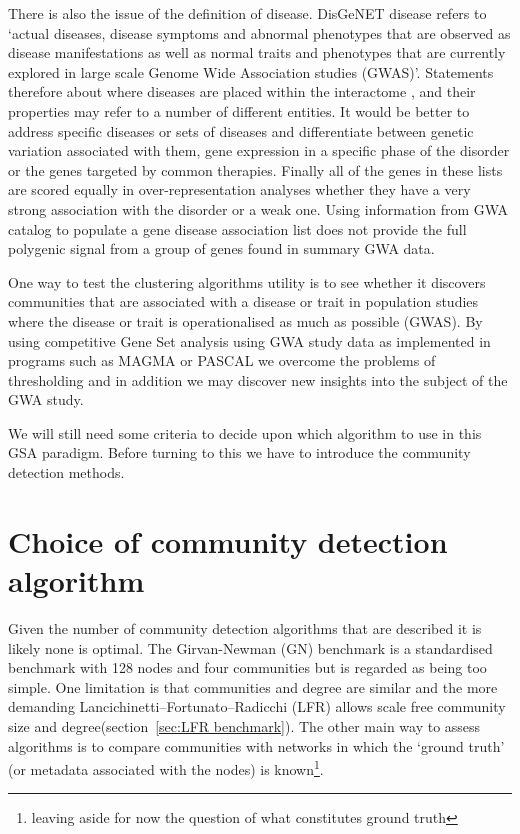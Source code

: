 There is also the issue of the definition of disease.  DisGeNET disease refers to `actual diseases, disease symptoms and abnormal phenotypes that are observed as disease manifestations as well as normal traits and phenotypes that are currently explored in large scale Genome Wide Association studies (GWAS)\cite{pinero2020disgenet}'. Statements therefore about where diseases are placed within the interactome \cite{barabasi2016network},\cite{ghiassian2015disease} and their properties may refer to a number of different entities. It would be better to address specific diseases or sets of diseases and differentiate between genetic variation associated with them, gene expression in a specific phase of the disorder or the genes targeted by common therapies. Finally all of the genes in these lists are scored equally in over-representation analyses whether they have a very strong association with the disorder or a weak one. Using information from GWA catalog to populate a gene disease association list does not provide the full polygenic signal from a group of genes found in summary GWA data. 

One way to test the clustering algorithms utility is to see whether it discovers communities that are associated with a disease or trait in population studies where the disease or trait is operationalised as much as possible (GWAS)\cite{cai2020reviewing}\cite{van2013power}. By using competitive Gene Set analysis using GWA study data as implemented in programs such as MAGMA\cite{de2015magma} or PASCAL\cite{lamparter2016fast} we overcome the problems of thresholding and in addition we may discover new insights into the subject of the GWA study.

We will still need some criteria to decide upon which algorithm to use in this GSA paradigm. Before turning to this we have to introduce the community detection methods. 





\section{Choice of community detection algorithm}
\label{sec:choice of community detection algorithm}
Given the number of community detection algorithms that are described it is likely none is optimal\cite{aldecoa2013exploring}. The Girvan-Newman (GN) benchmark \cite{girvan2002community} is a standardised benchmark with 128 nodes and four communities but is regarded as being too simple\cite{aldecoa2013exploring}. One limitation is that communities and degree are similar and the more demanding Lancichinetti–Fortunato–Radicchi (LFR)\cite{lancichinetti2008benchmark} allows scale free community size and degree(section~\ref{sec:LFR benchmark}). The other main way to assess algorithms is to compare communities with networks in which the `ground truth' (or metadata associated with the nodes) is known\footnote{leaving aside for now the question of what constitutes ground truth}\cite{leskovec2010empirical}.

